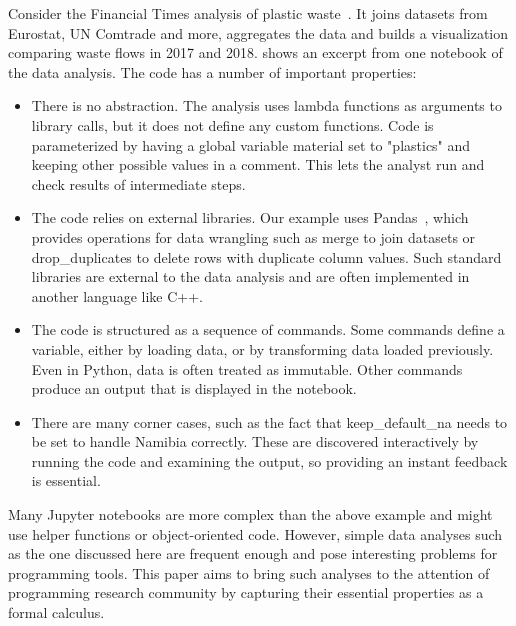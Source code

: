 \documentclass[english,crc,references=cleveref]{programming}
\theoremstyle{plain}
\theoremstyle{definition}
\newcommand{\str}[1]{\textnormal{\textcolor{strclr}{\sffamily "#1"}}}
\newcommand{\ident}[1]{\textnormal{\textcolor{idclr}{\sffamily #1}}}
\begin{document}
Consider the Financial Times analysis of plastic waste~\cite{ftnotebooks,ftarticle}. It joins
datasets from Eurostat, UN Comtrade and more, aggregates the data and
builds a visualization comparing waste flows in 2017 and 2018.  shows
an excerpt from one notebook of the data analysis. The code has a number of important properties:
%
\begin{itemize}
\item There is no abstraction. The analysis uses lambda functions as arguments to library calls,
  but it does not define any custom functions. Code is parameterized by having a global variable
  \ident{material} set to \str{plastics} and keeping other possible values in a comment.
  This lets the analyst run and check results of intermediate steps.

\item The code relies on external libraries. Our example uses Pandas~\cite{pandas},
  which provides operations for data wrangling such as \ident{merge} to join datasets
  or \ident{drop\_duplicates} to delete rows with duplicate column values. Such standard libraries
  are external to the data analysis and are often implemented in another language like C++.

\item The code is structured as a sequence of commands. Some commands define a variable, either by
  loading data, or by transforming data loaded previously. Even in Python, data is often treated
  as immutable. Other commands produce an output that is displayed in the notebook.

\item There are many corner cases, such as the fact that \ident{keep\_default\_na}
  needs to be set to handle Namibia correctly. These are discovered interactively by
  running the code and examining the output, so providing an instant feedback is essential.
\end{itemize}
%
%
Many Jupyter notebooks are more complex than the above example and might use helper
functions or object-oriented code. However, simple data analyses such as the one discussed
here are frequent enough and pose interesting problems for programming tools.
This paper aims to bring such analyses to the attention of programming research community
by capturing their essential properties as a formal calculus.
\end{document}
